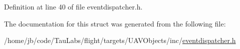 \-Definition at line 40 of file eventdispatcher.\-h.



\-The documentation for this struct was generated from the following file\-:\begin{DoxyCompactItemize}
\item 
/home/jb/code/\-Tau\-Labs/flight/targets/\-U\-A\-V\-Objects/inc/\hyperlink{eventdispatcher_8h}{eventdispatcher.\-h}\end{DoxyCompactItemize}
